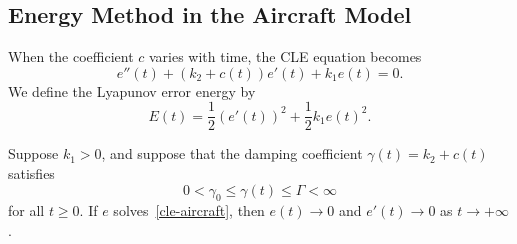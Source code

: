 ﻿\documentclass[12pt]{article}
\begin{document}
\subsection{Energy Method in the Aircraft Model}

When the coefficient $c$ varies with time, the CLE equation becomes
\begin{equation}\label{cle-aircraft}
 \boxed{e''(t) + (k_2 + c(t))e'(t) + k_1e(t) = 0. }
\end{equation}
We define the Lyapunov error energy by
\[
 E(t) = \frac{1}{2}(e'(t))^2 + \frac{1}{2}k_1e(t)^2.
\]

\begin{theorem}
Suppose $k_1 > 0$, and suppose that the damping coefficient
$\gamma(t) = k_2 + c(t)$ satisfies
\[
 0 < \gamma_0\le \gamma(t)\le \Gamma < \infty
\]
for all $t \geq 0$. If $e$ solves~\eqref{cle-aircraft}, then $e(t) \to 0$ and $e'(t) \to 0$ as $t \to + \infty$.

\end{theorem}
\end{document}
